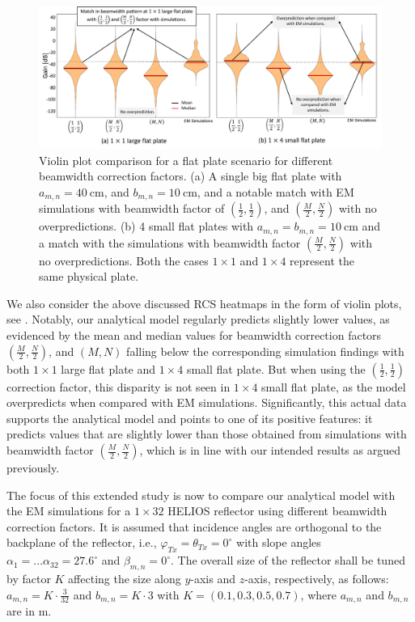 \begin{figure}[H]
	\centering
	\includegraphics[width=1.0\linewidth]{images/Section 3 Images/Casestudy_flatplate_violin}
	\caption{Violin plot comparison for a flat plate scenario for different beamwidth correction factors. (a) A single big flat plate with $a_{m,n}=\SI{40}{\centi\meter}$, and $b_{m,n}=\SI{10}{\centi\meter}$, and a notable match with EM simulations with beamwidth factor of $(\frac{1}{2},\frac{1}{2})$, and $(\frac{M}{2},\frac{N}{2})$ with no overpredictions. (b) 4 small flat plates with $a_{m,n}=b_{m,n}=\SI{10}{\centi\meter}$ and a match with the simulations with beamwidth factor $(\frac{M}{2},\frac{N}{2})$ with no overpredictions. Both the cases $1 \times 1$ and $1 \times 4$ represent the same physical plate.}
	\label{fig:Casestudy_flatplate_violin}
\end{figure}
We also consider the above discussed RCS heatmaps in the form of violin plots, see . Notably, our analytical model regularly predicts slightly lower values, as evidenced by the mean and median values for beamwidth correction factors $(\frac{M}{2},\frac{N}{2})$, and $(M,N)$ falling below the corresponding simulation findings with both $1 \times 1$ large flat plate and $1 \times 4$ small flat plate. But when using the $(\frac{1}{2},\frac{1}{2})$ correction factor, this disparity is not seen in $1 \times 4$ small flat plate, as the model overpredicts when compared with EM simulations. Significantly, this actual data supports the analytical model and points to one of its positive features: it predicts values that are slightly lower than those obtained from simulations with beamwidth factor  $(\frac{M}{2},\frac{N}{2})$, which is in line with our intended results as argued previously.

The focus of this extended study is now to compare our analytical model with the EM simulations for a $1\times 32$ HELIOS reflector using different beamwidth correction factors. It is assumed that incidence angles are orthogonal to the backplane of the reflector, i.e., $\varphi_{Tx}=\theta_{Tx}=0^\circ$  with slope angles $\alpha_{1}=...\alpha_{32}=\num{27.6}^\circ$ and $\beta_{m,n}=0^\circ$. The overall size of the reflector shall be tuned by factor $K$ affecting the size along $y$-axis and $z$-axis, respectively, as follows: $a_{m,n}=K \cdot \frac{3}{32}$ and $b_{m,n}=K \cdot 3$ with $K = (0.1, 0.3, 0.5, 0.7)$, where $a_{m,n}$ and $b_{m,n}$ are in \si{\meter}.

